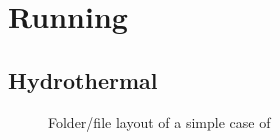\section{Running \foam}

\subsection{Hydrothermal}

\begin{figure}
	\centering
	
	\caption{Folder/file layout of a simple case of \darcyfoam}
	\label{fig:filetree_case}
\end{figure}